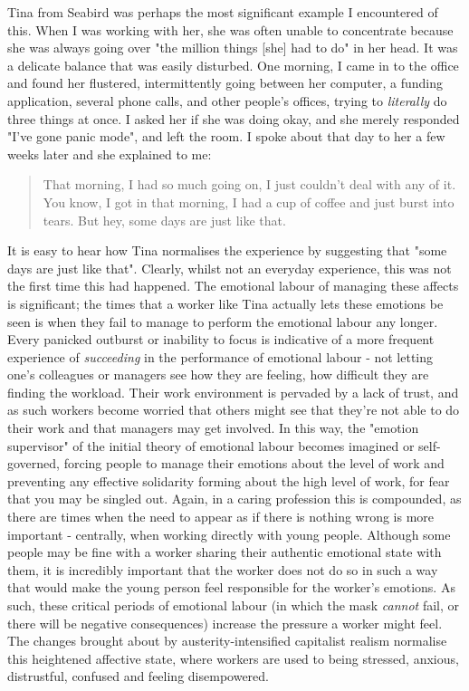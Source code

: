 Tina from Seabird was perhaps the most significant example I encountered of this. When I was working with her, she was often unable to concentrate because she was always going over "the million things [she] had to do" in her head. It was a delicate balance that was easily disturbed. One morning, I came in to the office and found her flustered, intermittently going between her computer, a funding application, several phone calls, and other people's offices, trying to \emph{literally} do three things at once. I asked her if she was doing okay, and she merely responded "I've gone panic mode", and left the room. I spoke about that day to her a few weeks later and she explained to me: 
\begin{quote} 
That morning, I had so much going on, I just couldn't deal with any of it. You know, I got in that morning, I had a cup of coffee and just burst into tears. But hey, some days are just like that.
\end{quote}
It is easy to hear how Tina normalises the experience by suggesting that "some days are just like that". Clearly, whilst not an everyday experience, this was not the first time this had happened. The emotional labour of managing these affects is significant; the times that a worker like Tina actually lets these emotions be seen is when they fail to manage to perform the emotional labour any longer. Every panicked outburst or inability to focus is indicative of a more frequent experience of \emph{succeeding} in the performance of emotional labour - not letting one's colleagues or managers see how they are feeling, how difficult they are finding the workload. Their work environment is pervaded by a lack of trust, and as such workers become worried that others might see that they’re not able to do their work and that managers may get involved. In this way, the "emotion supervisor" of the initial theory of emotional labour becomes imagined or self-governed, forcing people to manage their emotions about the level of work and preventing any effective solidarity forming about the high level of work, for fear that you may be singled out. Again, in a caring profession this is compounded, as there are times when the need to appear as if there is nothing wrong is more important - centrally, when working directly with young people. Although some people may be fine with a worker sharing their authentic emotional state with them, it is incredibly important that the worker does not do so in such a way that would make the young person feel responsible for the worker's emotions. As such, these critical periods of emotional labour (in which the mask \emph{cannot} fail, or there will be negative consequences) increase the pressure a worker might feel. The changes brought about by austerity-intensified capitalist realism normalise this heightened affective state, where workers are used to being stressed, anxious, distrustful, confused and feeling disempowered.

